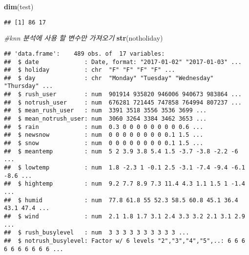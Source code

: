 \documentclass[]{article}
\newenvironment{Shaded}{\begin{snugshade}}{\end{snugshade}}
\newcommand{\KeywordTok}[1]{\textcolor[rgb]{0.13,0.29,0.53}{\textbf{#1}}}
\newcommand{\CommentTok}[1]{\textcolor[rgb]{0.56,0.35,0.01}{\textit{#1}}}
\newcommand{\NormalTok}[1]{#1}
\begin{document}
\begin{Shaded}
\begin{Highlighting}[]
\KeywordTok{dim}\NormalTok{(test)}
\end{Highlighting}
\end{Shaded}

\begin{verbatim}
## [1] 86 17
\end{verbatim}

\begin{Shaded}
\begin{Highlighting}[]
\CommentTok{#knn 분석에 사용 할 변수만 가져오기}
\KeywordTok{str}\NormalTok{(notholiday)}
\end{Highlighting}
\end{Shaded}

\begin{verbatim}
## 'data.frame':    489 obs. of  17 variables:
##  $ date             : Date, format: "2017-01-02" "2017-01-03" ...
##  $ holiday          : chr  "F" "F" "F" "F" ...
##  $ day              : chr  "Monday" "Tuesday" "Wednesday" "Thursday" ...
##  $ rush_user        : num  901914 935820 946006 940673 983864 ...
##  $ notrush_user     : num  676281 721445 747858 764994 807237 ...
##  $ mean_rush_user   : num  3391 3518 3556 3536 3699 ...
##  $ mean_notrush_user: num  3060 3264 3384 3462 3653 ...
##  $ rain             : num  0.3 0 0 0 0 0 0 0 0 0.6 ...
##  $ newsnow          : num  0 0 0 0 0 0 0 0 0.1 1.5 ...
##  $ snow             : num  0 0 0 0 0 0 0 0 0.1 1.5 ...
##  $ meantemp         : num  5 2 3.9 3.8 5.4 1.5 -3.7 -3.8 -2.2 -6 ...
##  $ lowtemp          : num  1.8 -2.3 1 -0.1 2.5 -3.1 -7.4 -9.4 -6.1 -8.6 ...
##  $ hightemp         : num  9.2 7.7 8.9 7.3 11.4 4.3 1.1 1.5 1 -1.4 ...
##  $ humid            : num  77.8 61.8 55 52.3 58.5 60.8 45.1 36.4 43.1 47.4 ...
##  $ wind             : num  2.1 1.8 1.7 3.1 2.4 3.3 3.2 2.1 3.1 2.9 ...
##  $ rush_busylevel   : num  3 3 3 3 3 3 3 3 3 3 ...
##  $ notrush_busylevel: Factor w/ 6 levels "2","3","4","5",..: 6 6 6 6 6 6 6 6 6 6 ...
\end{verbatim}
\end{document}
